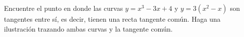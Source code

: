 \item Encuentre el punto en donde las curvas $y = x^3 - 3x + 4$ y $y = 3(x^2 - x)$ son tangentes entre sí, es decir, tienen una recta tangente común. Haga una ilustración trazando ambas curvas y la tangente común.
